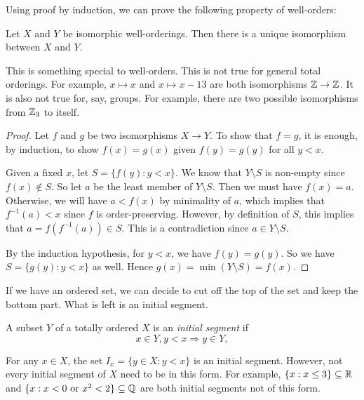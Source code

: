 \documentclass[a4paper]{article}
\begin{document}
Using proof by induction, we can prove the following property of well-orders:
\begin{prop}
  Let $X$ and $Y$ be isomorphic well-orderings. Then there is a unique isomorphism between $X$ and $Y$.
\end{prop}
This is something special to well-orders. This is not true for general total orderings. For example, $x\mapsto x$ and $x\mapsto x - 13$ are both isomorphisms $\mathbb{Z}\to \mathbb{Z}$. It is also not true for, say, groups. For example, there are two possible isomorphisms from $\mathbb{Z}_3$ to itself.

\begin{proof}
  Let $f$ and $g$ be two isomorphisms $X\to Y$. To show that $f = g$, it is enough, by induction, to show $f(x) = g(x)$ given $f(y) = g(y)$ for all $y < x$.

  Given a fixed $x$, let $S = \{f(y): y < x\}$. We know that $Y\setminus S$ is non-empty since $f(x) \not\in S$. So let $a$ be the least member of $Y\setminus S$. Then we must have $f(x) = a$. Otherwise, we will have $a < f(x)$ by minimality of $a$, which implies that $f^{-1}(a) < x$ since $f$ is order-preserving. However, by definition of $S$, this implies that $a = f(f^{-1}(a)) \in S$. This is a contradiction since $a \in Y\setminus S$.

  By the induction hypothesis, for $y < x$, we have $f(y) = g(y)$. So we have $S = \{g(y): y < x\}$ as well. Hence $g(x) = \min(Y\setminus S) = f(x)$.
\end{proof}

If we have an ordered set, we can decide to cut off the top of the set and keep the bottom part. What is left is an initial segment.
\begin{defi}
  A subset $Y$ of a totally ordered $X$ is an \emph{initial segment} if
  \[
    x\in Y, y< x \Rightarrow y\in Y,
  \]
  \begin{center}
  \end{center}
\end{defi}

\begin{eg}
  For any $x\in X$, the set $I_x = \{y\in X: y < x\}$ is an initial segment. However, not every initial segment of $X$ need to be in this form. For example, $\{x: x\leq 3\}\subseteq \mathbb{R}$ and $\{x: x < 0\text{ or }x^2 < 2\}\subseteq \mathbb{Q}$ are both initial segments not of this form.
\end{eg}
\end{document}
